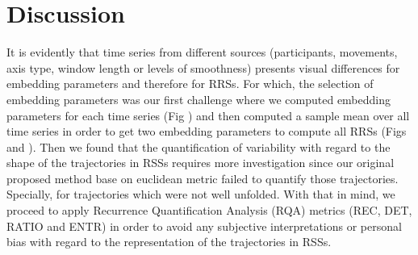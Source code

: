 \documentclass[fleqn,10pt]{wlscirep}
\begin{document}
\section*{Discussion}


%


It is evidently that time series from different sources 
(participants, movements, axis type, window length or levels of smoothness) 
presents visual differences for embedding parameters and therefore for RRSs. 
For which, the selection of embedding parameters was our first challenge 
where we computed embedding parameters for each time series 
(Fig \label{fig:caoami}) and then computed a sample mean over 
all time series in order to get two embedding parameters 
to compute all RRSs (Figs \label{fig:rss_aHw10} and \label{fig:rss_aVw10}). 
Then we found that the quantification of variability with regard to 
the shape of the trajectories in RSSs requires more investigation 
since our original proposed method base on euclidean metric failed 
to quantify those trajectories. Specially, for trajectories which 
were not well unfolded. 
With that in mind, we proceed to apply 
Recurrence Quantification Analysis (RQA) metrics 
(REC, DET, RATIO and ENTR) in order to avoid any subjective interpretations 
or personal bias with regard to the representation of the trajectories in RSSs.
\end{document}
